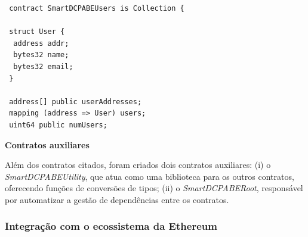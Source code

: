 \documentclass[a4paper,11pt]{article}
\begin{document}

\begin{lstlisting}
 contract SmartDCPABEUsers is Collection {

 struct User {
  address addr;
  bytes32 name;
  bytes32 email;
 }

 address[] public userAddresses;
 mapping (address => User) users;
 uint64 public numUsers;
\end{lstlisting}



\textbf{Contratos auxiliares}
\label{sec:sub:ImplementacaoSmartContracts:ContratosAuxiliares}

Além dos contratos citados, foram criados dois contratos auxiliares: (i) o \emph{SmartDCPABEUtility}, que atua como uma biblioteca para os outros contratos, oferecendo funções de conversões de tipos; (ii) o \emph{SmartDCPABERoot}, responsável por automatizar a gestão de dependências entre os contratos.

\subsubsection{Integração com o ecossistema da Ethereum}


\end{document}
